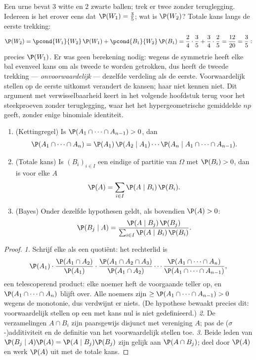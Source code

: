 \begin{example}\label{ex:b2:proba:seconddraw}
Een urne bevat $3$ witte en $2$ zwarte ballen; trek er twee zonder
teruglegging. Iedereen is het erover eens dat $\P(W_1) = \frac35$;
wat is $\P(W_2)$? Totale kans langs de eerste trekking:
\[
\P(W_2) = \pcond{W_1}{W_2}\,\P(W_1) +
\pcond{B_1}{W_2}\,\P(B_1)
= \frac24\cdot\frac35 + \frac34\cdot\frac25
= \frac{12}{20} = \frac35 :
\]
precies $\P(W_1)$. Er was geen berekening nodig: wegens de
symmetrie heeft elke bal evenveel kans om als tweede te worden
getrokken, dus heeft de tweede trekking --- \emph{onvoorwaardelijk}
--- dezelfde verdeling als de eerste. Voorwaardelijk stellen op de
eerste uitkomst verandert de kansen; haar niet kennen niet. Dit
argument met verwisselbaarheid keert in het volgende hoofdstuk
terug voor het steekproeven zonder teruglegging, waar het het
hypergeometrische gemiddelde $np$ geeft, zonder enige binomiale
identiteit.
\end{example}

\begin{theorem}\label{thm:b2:proba:bayes}
\leavevmode
\begin{enumerate}
\item (Kettingregel) Is $\P(A_1 \cap \dots \cap A_{n-1}) > 0$, dan
\[
\P(A_1 \cap \dots \cap A_n)
= \P(A_1)\,\P(A_2 \mid A_1)\cdots
\P(A_n \mid A_1 \cap \dots \cap A_{n-1}) .
\]
\item (Totale kans) Is $(B_i)_{i \in I}$ een eindige of 
partitie van $\Omega$ met $\P(B_i) > 0$, dan is voor elke
 $A$
\[
\P(A) = \sum_{i \in I} \P(A \mid B_i)\,\P(B_i) .
\]
\item (Bayes) Onder dezelfde hypothesen geldt, als bovendien
$\P(A) > 0$:
\[
\P(B_j \mid A)
= \frac{\P(A \mid B_j)\,\P(B_j)}
       {\sum_{i \in I} \P(A \mid B_i)\,\P(B_i)} .
\]
\end{enumerate}
\end{theorem}

\begin{proof}
\emph{1.} Schrijf elke  als een quotiënt: het
rechterlid is
\[
\P(A_1)\cdot\frac{\P(A_1 \cap A_2)}{\P(A_1)}\cdot
\frac{\P(A_1 \cap A_2 \cap A_3)}{\P(A_1 \cap A_2)}\cdots
\frac{\P(A_1 \cap \dots \cap A_n)}{\P(A_1 \cap \dots \cap
A_{n-1})},
\]
een telescoperend product: elke noemer heft de voorgaande teller
op, en $\P(A_1 \cap \dots \cap A_n)$ blijft over. Alle noemers zijn
$\geq \P(A_1 \cap \dots \cap A_{n-1}) > 0$ wegens de monotonie, dus
verdwijnt er niets. (De hypothese bewaakt precies dit:
voorwaardelijk stellen op een  met kans nul is niet
gedefinieerd.)
\emph{2.} De verzamelingen $A \cap B_i$ zijn paarsgewijs disjunct
met vereniging $A$; pas de ($\sigma$-)additiviteit en de definitie
van het voorwaardelijk stellen toe.
\emph{3.} Beide leden van $\P(B_j \mid A)\P(A) = \P(A \mid
B_j)\P(B_j)$ zijn gelijk aan $\P(A \cap B_j)$; deel door $\P(A)$ en
werk $\P(A)$ uit met de totale kans.
\end{proof}

